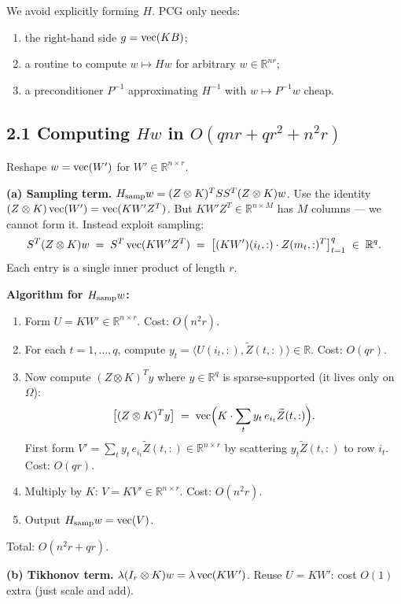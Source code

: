 We avoid explicitly forming $H$.  PCG only needs:
\begin{enumerate}\setlength\itemsep{2pt}
\item the right-hand side $g=\operatorname{vec}(KB)$;
\item a routine to compute $w\mapsto Hw$ for arbitrary $w\in\mathbb R^{nr}$;
\item a preconditioner $P^{-1}$ approximating $H^{-1}$ with $w\mapsto P^{-1}w$ cheap.
\end{enumerate}

\subsection*{2.1 Computing $H w$ in $O(qnr+qr^2+n^2r)$}

Reshape $w=\operatorname{vec}(W')$ for $W'\in\mathbb R^{n\times r}$.

\textbf{(a) Sampling term.}  $H_{\rm samp} w=(Z\otimes K)^T S S^T(Z\otimes K)w$.  Use the identity $(Z\otimes K)\operatorname{vec}(W')=\operatorname{vec}(KW'Z^T)$.  But $KW'Z^T\in\mathbb R^{n\times M}$ has $M$ columns — we cannot form it.  Instead exploit sampling:
\[
S^T(Z\otimes K)w \;=\; S^T\operatorname{vec}(KW'Z^T) \;=\; \bigl[(KW')(i_t,:)\cdot Z(m_t,:)^T\bigr]_{t=1}^q \;\in\;\mathbb R^q.
\]
Each entry is a single inner product of length $r$.

\textbf{Algorithm for $H_{\rm samp} w$:}
\begin{enumerate}\setlength\itemsep{2pt}
\item Form $U=KW'\in\mathbb R^{n\times r}$. \quad Cost: $O(n^2 r)$.
\item For each $t=1,\ldots,q$, compute $y_t=\langle U(i_t,:),\widetilde Z(t,:)\rangle\in\mathbb R$. \quad Cost: $O(qr)$.
\item Now compute $(Z\otimes K)^T y$ where $y\in\mathbb R^q$ is sparse-supported (it lives only on $\Omega$):
\[
\bigl[(Z\otimes K)^T y\bigr] \;=\; \operatorname{vec}\Bigl(K\cdot\sum_{t}y_t\,e_{i_t}\widetilde Z(t,:)\Bigr).
\]
First form $V'=\sum_t y_t\,e_{i_t}\widetilde Z(t,:)\in\mathbb R^{n\times r}$ by scattering $y_t\widetilde Z(t,:)$ to row $i_t$.  Cost: $O(qr)$.
\item Multiply by $K$: $V=KV'\in\mathbb R^{n\times r}$.  Cost: $O(n^2r)$.
\item Output $H_{\rm samp}w=\operatorname{vec}(V)$.
\end{enumerate}
Total: $O(n^2r + qr)$.

\textbf{(b) Tikhonov term.}  $\lambda(I_r\otimes K)w = \lambda\operatorname{vec}(KW')$.  Reuse $U=KW'$: cost $O(1)$ extra (just scale and add).

